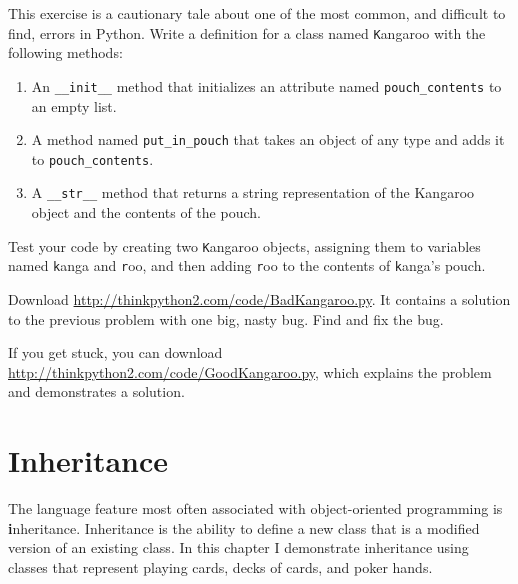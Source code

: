 \documentclass[
DIV=11,
fontsize=13,
twoside,
headinclude=false,
titlepage=firstiscover,
abstract=true,
headsepline=true,
footsepline=true,
chapterprefix=true, %
headings=big,
bibliography=totoc,%
captions=tableheading
]{scrbook}
\theoremstyle{definition}
\begin{document}
\begin{exercise}
\normalfont
\label{kangaroo}

This exercise is a cautionary tale about one of the most
common, and difficult to find, errors in Python.
Write a definition for a class named {\texttt Kangaroo} with the following
methods:

\begin{enumerate}

\item An \verb"__init__" method that initializes an attribute named 
\verb"pouch_contents" to an empty list.

\item A method named \verb"put_in_pouch" that takes an object
of any type and adds it to \verb"pouch_contents".

\item A \verb"__str__" method that returns a string representation
of the Kangaroo object and the contents of the pouch.

\end{enumerate}
%
Test your code 
by creating two {\texttt Kangaroo} objects, assigning them to variables
named {\texttt kanga} and {\texttt roo}, and then adding {\texttt roo} to the
contents of {\texttt kanga}'s pouch.

Download \url{http://thinkpython2.com/code/BadKangaroo.py}.  It contains
a solution to the previous problem with one big, nasty bug.
Find and fix the bug.

If you get stuck, you can download
\url{http://thinkpython2.com/code/GoodKangaroo.py}, which explains the
problem and demonstrates a solution.

\end{exercise}



\chapter{Inheritance}

The language feature most often associated with object-oriented
programming is {\textbf inheritance}.  Inheritance is the ability to
define a new class that is a modified version of an existing class.
In this chapter I demonstrate inheritance using classes that represent
playing cards, decks of cards, and poker hands.
\end{document}
